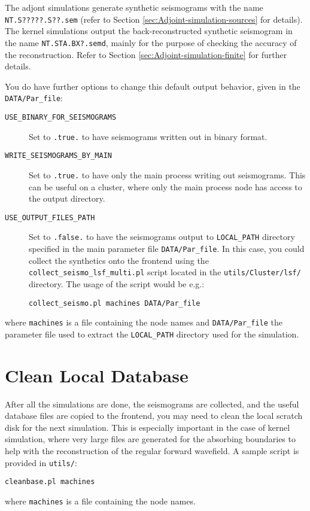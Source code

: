 The adjont simulations generate synthetic seismograms with the name
\texttt{NT.S?????.S??.sem} (refer to Section \ref{sec:Adjoint-simulation-sources}
for details). The kernel simulations output the back-reconstructed
synthetic seismogram in the name \texttt{NT.STA.BX?.semd}, mainly
for the purpose of checking the accuracy of the reconstruction. Refer
to Section \ref{sec:Adjoint-simulation-finite} for further details.\newline

You do have further options to change this default output behavior,
given in the \texttt{DATA/Par\_file}:
\begin{description}
\item [{\texttt{USE\_BINARY\_FOR\_SEISMOGRAMS}}] Set to \texttt{.true.} to have seismograms
written out in binary format.
\item [{\texttt{WRITE\_SEISMOGRAMS\_BY\_MAIN}}] Set to \texttt{.true.}
to have only the main process writing out seismograms. This can
be useful on a cluster, where only the main process node has access
to the output directory.
\item [{\texttt{USE\_OUTPUT\_FILES\_PATH}}] Set to \texttt{.false.} to
have the seismograms output to \texttt{LOCAL\_PATH} directory specified
in the main parameter file \texttt{DATA/Par\_file}. In this case,
you could collect the synthetics onto the frontend using the \texttt{collect\_seismo\_lsf\_multi.pl}
script located in the \texttt{utils/Cluster/lsf/} directory. The usage
of the script would be e.g.:

\begin{verbatim}
collect_seismo.pl machines DATA/Par_file
\end{verbatim}

\end{description}

where \texttt{machines} is a file containing the node names and \texttt{DATA/Par\_file}
the parameter file used to extract the \texttt{LOCAL\_PATH} directory
used for the simulation.


\section{Clean Local Database}

After all the simulations are done, the seismograms are collected,
and the useful database files are copied to the frontend, you may
need to clean the local scratch disk for the next simulation. This
is especially important in the case of kernel simulation, where very
large files are generated for the absorbing boundaries to help with
the reconstruction of the regular forward wavefield. A sample script
is provided in \texttt{utils/}:
\begin{verbatim}
cleanbase.pl machines
\end{verbatim}
where \texttt{machines} is a file containing the node names.


